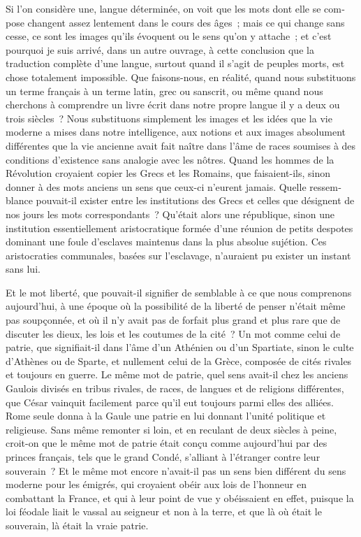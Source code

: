 \documentclass[french,twoside]{book} %
\begin{document}
Si l’on considère une, langue déterminée, on voit que les mots dont elle se com­pose changent assez lentement dans le cours des âges ; mais ce qui change sans cesse, ce sont les images qu’ils évoquent ou le sens qu’on y attache ; et c’est pourquoi je suis arrivé, dans un autre ouvrage, à cette conclusion que la traduction complète d’une langue, surtout quand il s’agit de peuples morts, est chose totalement impossible. Que faisons-nous, en réalité, quand nous substituons un terme français à un terme latin, grec ou sanscrit, ou même quand nous cherchons à comprendre un livre écrit dans notre propre langue il y a deux ou trois siècles ? Nous substituons simplement les images et les idées que la vie moderne a mises dans notre intelligence, aux notions et aux images absolument différentes que la vie ancienne avait fait naître dans l’âme de races soumises à des conditions d’existence sans analogie avec les nôtres. Quand les hommes de la Révolution croyaient copier les Grecs et les Romains, que faisaient-ils, sinon donner à des mots anciens un sens que ceux-ci n’eurent jamais. Quelle ressem­blance pouvait-il exister entre les institutions des Grecs et celles que désignent de nos jours les mots correspondants ? Qu’était alors une république, sinon une institution essentiellement aristocratique formée d’une réunion de petits despotes dominant une foule d’esclaves maintenus dans la plus absolue sujétion. Ces aristocraties communa­les, basées sur l’esclavage, n’auraient pu exister un instant sans lui.\par
Et le mot liberté, que pouvait-il signifier de semblable à ce que nous comprenons aujourd’hui, à une époque où la possibilité de la liberté de penser n’était même pas soupçonnée, et où il n’y avait pas de forfait plus grand et plus rare que de discuter les dieux, les lois et les coutumes de la cité ? Un mot comme celui de patrie, que signifiait-il dans l’âme d’un Athénien ou d’un Spartiate, sinon le culte d’Athènes ou de Sparte, et nullement celui de la Grèce, composée de cités rivales et toujours en guerre. Le même mot de patrie, quel sens avait-il chez les anciens Gaulois divisés en tribus rivales, de races, de langues et de religions différentes, que César vainquit facilement parce qu’il eut toujours parmi elles des alliées. Rome seule donna à la Gaule une patrie en lui donnant l’unité politique et religieuse. Sans même remonter si loin, et en reculant de deux siècles à peine, croit-on que le même mot de patrie était conçu comme aujourd’hui par des princes français, tels que le grand Condé, s’alliant à l’étranger contre leur souverain ? Et le même mot encore n’avait-il pas un sens bien différent du sens moderne pour les émigrés, qui croyaient obéir aux lois de l’honneur en combattant la France, et qui à leur point de vue y obéissaient en effet, puisque la loi féodale liait le vassal au seigneur et non à la terre, et que là où était le souverain, là était la vraie patrie.\par
\end{document}

